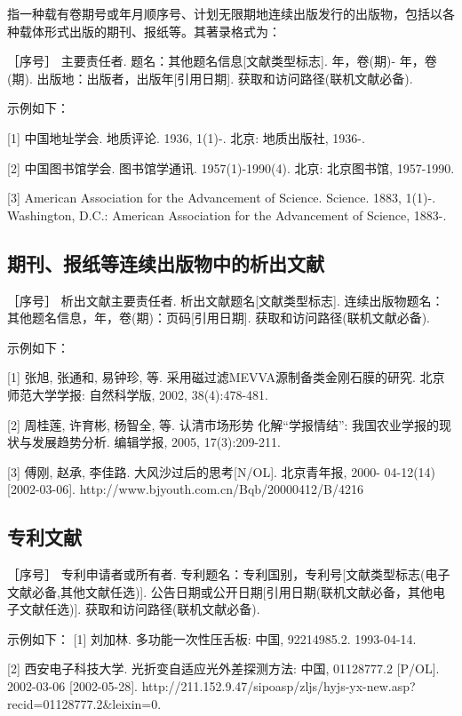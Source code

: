 指一种载有卷期号或年月顺序号、计划无限期地连续出版发行的出版物，包括以各种载体形式出版的期刊、报纸等。其著录格式为：

\kaishu
［序号］ 主要责任者. 题名：其他题名信息[文献类型标志]. 年，卷(期)- 年，卷(期). 出版地：出版者，出版年[引用日期]. 获取和访问路径(联机文献必备).

\songti
示例如下：

[1] 中国地址学会. 地质评论. 1936, 1(1)-. 北京: 地质出版社, 1936-.

[2] 中国图书馆学会. 图书馆学通讯. 1957(1)-1990(4). 北京: 北京图书馆, 1957-1990.

[3] American Association for the Advancement of Science. Science. 1883, 1(1)-. Washington, D.C.: American Association for the Advancement of Science, 1883-.

\subsection{期刊、报纸等连续出版物中的析出文献}

\kaishu［序号］ 析出文献主要责任者. 析出文献题名[文献类型标志]. 连续出版物题名：其他题名信息，年，卷(期)：页码[引用日期]. 获取和访问路径(联机文献必备).

\songti
示例如下：

[1] 张旭, 张通和, 易钟珍, 等. 采用磁过滤MEVVA源制备类金刚石膜的研究. 北京师范大学学报: 自然科学版, 2002, 38(4):478-481.

[2] 周桂莲, 许育彬, 杨智全, 等. 认清市场形势 化解“学报情结”: 我国农业学报的现状与发展趋势分析. 编辑学报, 2005, 17(3):209-211.

[3] 傅刚, 赵承, 李佳路. 大风沙过后的思考[N/OL]. 北京青年报, 2000- 04-12(14) [2002-03-06]. http://www.bjyouth.com.cn/Bqb/20000412/B/4216%

\subsection{专利文献}

\kaishu［序号］ 专利申请者或所有者. 专利题名：专利国别，专利号[文献类型标志(电子文献必备,其他文献任选)]. 公告日期或公开日期[引用日期(联机文献必备，其他电子文献任选)]. 获取和访问路径(联机文献必备).

\songti
示例如下：
[1] 刘加林. 多功能一次性压舌板: 中国, 92214985.2. 1993-04-14.

[2] 西安电子科技大学. 光折变自适应光外差探测方法: 中国, 01128777.2 [P/OL]. 2002-03-06 [2002-05-28]. http://211.152.9.47/sipoasp/zljs/hyjs-yx-new.asp? recid=01128777.2\&leixin=0.

